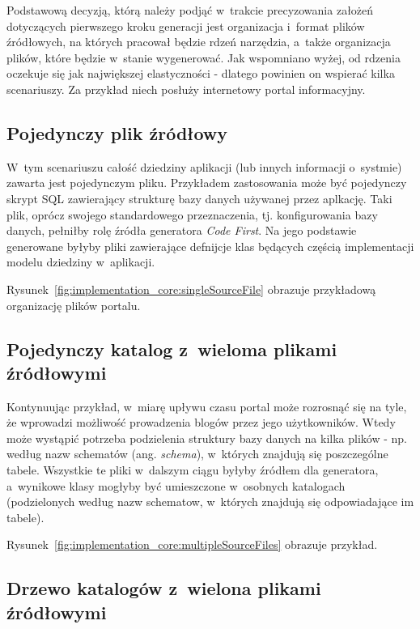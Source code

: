 Podstawową decyzją, którą należy podjąć w~trakcie precyzowania założeń dotyczących pierwszego kroku generacji jest organizacja i~format plików źródłowych, na których pracował będzie rdzeń narzędzia, a~także organizacja plików, które będzie w~stanie wygenerować.
Jak wspomniano wyżej, od rdzenia oczekuje się jak największej elastyczności - dlatego powinien on wspierać kilka scenariuszy.
Za przykład niech posłuży internetowy portal informacyjny.


\subsection{Pojedynczy plik źródłowy}

W~tym scenariuszu całość dziedziny aplikacji (lub innych informacji o~systmie) zawarta jest pojedynczym pliku.
Przykładem zastosowania może być pojedynczy skrypt SQL zawierający strukturę bazy danych używanej przez aplkację.
Taki plik, oprócz swojego standardowego przeznaczenia, tj. konfigurowania bazy danych, pełniłby rolę źródła generatora \emph{Code First}.
Na jego podstawie generowane byłyby pliki zawierające defnijcje klas będących częścią implementacji modelu dziedziny w~aplikacji.

Rysunek~\ref{fig:implementation_core:singleSourceFile} obrazuje przykładową organizację plików portalu.




\subsection{Pojedynczy katalog z~wieloma plikami źródłowymi}

Kontynuując przykład, w~miarę upływu czasu portal może rozrosnąć się na tyle, że wprowadzi możliwość prowadzenia blogów przez jego użytkowników.
Wtedy może wystąpić potrzeba podzielenia struktury bazy danych na kilka plików - np. według nazw schematów (ang. \emph{schema}), w~których znajdują się poszczególne tabele.
Wszystkie te pliki w~dalszym ciągu byłyby źródłem dla generatora, a~wynikowe klasy mogłyby być umieszczone w~osobnych katalogach (podzielonych według nazw schematow, w~których znajdują się odpowiadające im tabele).

Rysunek~\ref{fig:implementation_core:multipleSourceFiles} obrazuje przykład.




\subsection{Drzewo katalogów z~wielona plikami źródłowymi} \label{sec:core:files_structure:many_folders}

